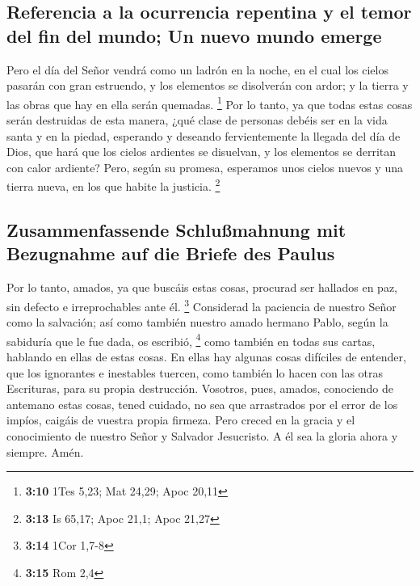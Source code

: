 \hypertarget{referencia-a-la-ocurrencia-repentina-y-el-temor-del-fin-del-mundo-un-nuevo-mundo-emerge}{%
\subsection{Referencia a la ocurrencia repentina y el temor del fin del
mundo; Un nuevo mundo
emerge}\label{referencia-a-la-ocurrencia-repentina-y-el-temor-del-fin-del-mundo-un-nuevo-mundo-emerge}}

 Pero el día del Señor vendrá como un ladrón en la noche,
en el cual los cielos pasarán con gran estruendo, y los elementos se
disolverán con ardor; y la tierra y las obras que hay en ella serán
quemadas. \footnote{\textbf{3:10} 1Tes 5,23; Mat 24,29; Apoc 20,11}
 Por lo tanto, ya que todas estas cosas serán destruidas
de esta manera, ¿qué clase de personas debéis ser en la vida santa y en
la piedad,  esperando y deseando fervientemente la
llegada del día de Dios, que hará que los cielos ardientes se disuelvan,
y los elementos se derritan con calor ardiente?  Pero,
según su promesa, esperamos unos cielos nuevos y una tierra nueva, en
los que habite la justicia. \footnote{\textbf{3:13} Is 65,17; Apoc 21,1;
  Apoc 21,27}

\hypertarget{zusammenfassende-schluuxdfmahnung-mit-bezugnahme-auf-die-briefe-des-paulus}{%
\subsection{Zusammenfassende Schlußmahnung mit Bezugnahme auf die Briefe
des
Paulus}\label{zusammenfassende-schluuxdfmahnung-mit-bezugnahme-auf-die-briefe-des-paulus}}

 Por lo tanto, amados, ya que buscáis estas cosas,
procurad ser hallados en paz, sin defecto e irreprochables ante él.
\footnote{\textbf{3:14} 1Cor 1,7-8}  Considerad la
paciencia de nuestro Señor como la salvación; así como también nuestro
amado hermano Pablo, según la sabiduría que le fue dada, os escribió,
\footnote{\textbf{3:15} Rom 2,4}  como también en todas
sus cartas, hablando en ellas de estas cosas. En ellas hay algunas cosas
difíciles de entender, que los ignorantes e inestables tuercen, como
también lo hacen con las otras Escrituras, para su propia destrucción.
 Vosotros, pues, amados, conociendo de antemano estas
cosas, tened cuidado, no sea que arrastrados por el error de los impíos,
caigáis de vuestra propia firmeza.  Pero creced en la
gracia y el conocimiento de nuestro Señor y Salvador Jesucristo. A él
sea la gloria ahora y siempre. Amén.
